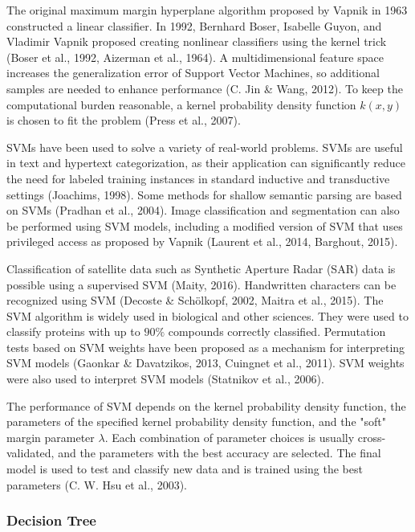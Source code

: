 \documentclass[sn-mathphys-num]{sn-jnl}%
\begin{document}
The original maximum margin hyperplane algorithm proposed by Vapnik in 1963 constructed a linear classifier. In 1992, Bernhard Boser, Isabelle Guyon, and Vladimir Vapnik proposed creating nonlinear classifiers using the kernel trick (Boser et al., 1992, Aizerman et al., 1964). A multidimensional feature space increases the generalization error of Support Vector Machines, so additional samples are needed to enhance performance (C. Jin & Wang, 2012). To keep the computational burden reasonable, a kernel probability density function $k(x, y)$ is chosen to fit the problem (Press et al., 2007).

SVMs have been used to solve a variety of real-world problems. SVMs are useful in text and hypertext categorization, as their application can significantly reduce the need for labeled training instances in standard inductive and transductive settings (Joachims, 1998). Some methods for shallow semantic parsing are based on SVMs (Pradhan et al., 2004). Image classification and segmentation can also be performed using SVM models, including a modified version of SVM that uses privileged access as proposed by Vapnik (Laurent et al., 2014, Barghout, 2015).

Classification of satellite data such as Synthetic Aperture Radar (SAR) data is possible using a supervised SVM (Maity, 2016). Handwritten characters can be recognized using SVM (Decoste & Schölkopf, 2002, Maitra et al., 2015). The SVM algorithm is widely used in biological and other sciences. They were used to classify proteins with up to $90\%$ compounds correctly classified. Permutation tests based on SVM weights have been proposed as a mechanism for interpreting SVM models (Gaonkar & Davatzikos, 2013, Cuingnet et al., 2011). SVM weights were also used to interpret SVM models (Statnikov et al., 2006).

The performance of SVM depends on the kernel probability density function, the parameters of the specified kernel probability density function, and the "soft" margin parameter $\lambda$. Each combination of parameter choices is usually cross-validated, and the parameters with the best accuracy are selected. The final model is used to test and classify new data and is trained using the best parameters (C. W. Hsu et al., 2003).

\subsubsection{Decision Tree}
\end{document}
